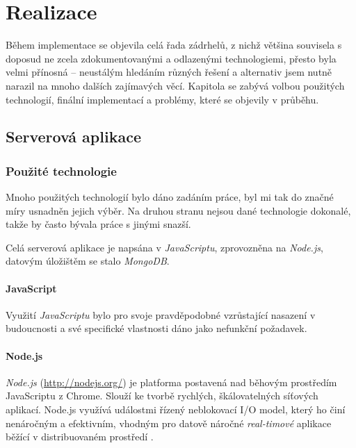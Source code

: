 
\chapter{Realizace}
Během implementace se objevila celá řada zádrhelů, z nichž většina souvisela s doposud ne zcela zdokumentovanými a odlazenými technologiemi, přesto byla velmi přínosná -- neustálým hledáním různých řešení a alternativ jsem nutně narazil na mnoho dalších zajímavých věcí. Kapitola se zabývá volbou použitých technologií, finální implementací a problémy, které se objevily v průběhu.

\section{Serverová aplikace}


\subsection{Použité technologie}
Mnoho použitých technologií bylo dáno zadáním práce, byl mi tak do značné míry usnadněn jejich výběr. Na druhou stranu nejsou dané technologie dokonalé, takže by často bývala práce s jinými snazší.

Celá serverová aplikace je napsána v \emph{JavaScriptu}, zprovozněna na \emph{Node.js}, datovým úložištěm se stalo \emph{MongoDB}.

\subsubsection{JavaScript}
Využití \emph{JavaScriptu} bylo pro svoje pravděpodobné vzrůstající nasazení v budoucnosti a své specifické vlastnosti dáno jako nefunkční požadavek.

\subsubsection{Node.js}
\emph{Node.js} (\url{http://nodejs.org/}) je platforma postavená nad běhovým prostředím JavaScriptu z Chrome. Slouží ke tvorbě rychlých, škálovatelných síťových aplikací. Node.js využívá událostmi řízený neblokovací I/O model, který ho činí nenáročným a efektivním, vhodným pro datově náročné \textit{real-timové} aplikace běžící v distribuovaném prostředí \cite{Node}.

